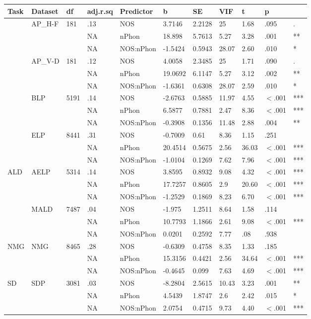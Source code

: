 \begin{table}[ht]
\centering
\begingroup\normalsize
\begin{tabular}{lllllllllll}
  \hline
Task & Dataset & df & adj.r.sq & Predictor & b & SE & VIF & t & p &  \\ 
  \hline
 & AP\_H-F & 181 & .13 & NOS & 3.7146 & 2.2128 & 25 & 1.68 & .095 & . \\ 
   &  &  & NA & nPhon & 18.898 & 5.7613 & 5.27 & 3.28 & .001 & ** \\ 
   &  &  & NA & NOS:nPhon & -1.5424 & 0.5943 & 28.07 & 2.60 & .010 & * \\ 
   & AP\_V-D & 181 & .12 & NOS & 4.0058 & 2.3485 & 25 & 1.71 & .090 & . \\ 
   &  &  & NA & nPhon & 19.0692 & 6.1147 & 5.27 & 3.12 & .002 & ** \\ 
   &  &  & NA & NOS:nPhon & -1.6361 & 0.6308 & 28.07 & 2.59 & .010 & * \\ 
   & BLP & 5191 & .14 & NOS & -2.6763 & 0.5885 & 11.97 & 4.55 & $<$.001 & *** \\ 
   &  &  & NA & nPhon & 6.5877 & 0.7881 & 2.47 & 8.36 & $<$.001 & *** \\ 
   &  &  & NA & NOS:nPhon & -0.3908 & 0.1356 & 11.48 & 2.88 & .004 & ** \\ 
   & ELP & 8441 & .31 & NOS & -0.7009 & 0.61 & 8.36 & 1.15 & .251 &   \\ 
   &  &  & NA & nPhon & 20.4514 & 0.5675 & 2.56 & 36.03 & $<$.001 & *** \\ 
   &  &  & NA & NOS:nPhon & -1.0104 & 0.1269 & 7.62 & 7.96 & $<$.001 & *** \\ 
  ALD & AELP & 5314 & .14 & NOS & 3.8595 & 0.8932 & 9.08 & 4.32 & $<$.001 & *** \\ 
   &  &  & NA & nPhon & 17.7257 & 0.8605 & 2.9 & 20.60 & $<$.001 & *** \\ 
   &  &  & NA & NOS:nPhon & -1.2529 & 0.1869 & 8.23 & 6.70 & $<$.001 & *** \\ 
   & MALD & 7487 & .04 & NOS & -1.975 & 1.2511 & 8.64 & 1.58 & .114 &   \\ 
   &  &  & NA & nPhon & 10.7793 & 1.1866 & 2.61 & 9.08 & $<$.001 & *** \\ 
   &  &  & NA & NOS:nPhon & 0.0201 & 0.2592 & 7.77 & .08 & .938 &   \\ 
  NMG & NMG & 8465 & .28 & NOS & -0.6309 & 0.4758 & 8.35 & 1.33 & .185 &   \\ 
   &  &  & NA & nPhon & 15.3156 & 0.4421 & 2.56 & 34.64 & $<$.001 & *** \\ 
   &  &  & NA & NOS:nPhon & -0.4645 & 0.099 & 7.63 & 4.69 & $<$.001 & *** \\ 
  SD & SDP & 3081 & .03 & NOS & -8.2804 & 2.5615 & 10.43 & 3.23 & .001 & ** \\ 
   &  &  & NA & nPhon & 4.5439 & 1.8747 & 2.6 & 2.42 & .015 & * \\ 
   &  &  & NA & NOS:nPhon & 2.0754 & 0.4715 & 9.73 & 4.40 & $<$.001 & *** \\ 
   \hline
\end{tabular}
\endgroup
\end{table}
